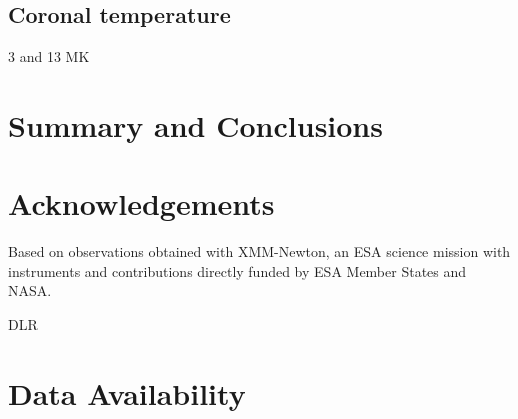 \documentclass[twocolumn]{aastex631}
\begin{document}
\cite{brown2023coronal}

\cite{johnstone2012soft}


\subsection{Coronal temperature}
\label{sec:discussion:xraytemp}

3 and 13 MK




\section{Summary and Conclusions}


\section*{Acknowledgements}
\citep{lightkurvecollaboration2018lightkurve}
Based on observations obtained with XMM-Newton, an ESA science mission with instruments and contributions directly funded by ESA Member States and NASA.

DLR
\section*{Data Availability}



\end{document}
